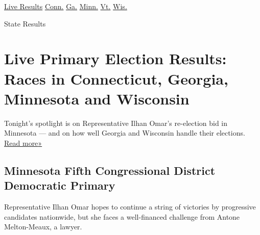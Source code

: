 \href{https://www.nytimes3xbfgragh.onion/interactive/2020/08/11/us/elections/results-connecticut-georgia-minnesota-wisconsin-primaries.html?action=click\&module=ELEX_results\&pgtype=Interactive\&region=Navigation}{Live
Results}
\href{https://www.nytimes3xbfgragh.onion/interactive/2020/08/11/us/elections/results-connecticut-primary-elections.html?action=click\&module=ELEX_results\&pgtype=Interactive\&region=Navigation}{Conn.}
\href{https://www.nytimes3xbfgragh.onion/interactive/2020/08/11/us/elections/results-georgia-primary-runoff-elections.html?action=click\&module=ELEX_results\&pgtype=Interactive\&region=Navigation}{Ga.}
\href{https://www.nytimes3xbfgragh.onion/interactive/2020/08/11/us/elections/results-minnesota-primary-elections.html?action=click\&module=ELEX_results\&pgtype=Interactive\&region=Navigation}{Minn.}
\href{https://www.nytimes3xbfgragh.onion/interactive/2020/08/11/us/elections/results-vermont-primary-elections.html?action=click\&module=ELEX_results\&pgtype=Interactive\&region=Navigation}{Vt.}
\href{https://www.nytimes3xbfgragh.onion/interactive/2020/08/11/us/elections/results-wisconsin-primary-elections.html?action=click\&module=ELEX_results\&pgtype=Interactive\&region=Navigation}{Wis.}

 State Results

\hypertarget{live-primary-election-results-races-in-connecticut-georgia-minnesota-and-wisconsin-1}{%
\section{Live Primary Election Results: Races in Connecticut, Georgia,
Minnesota and
Wisconsin}\label{live-primary-election-results-races-in-connecticut-georgia-minnesota-and-wisconsin-1}}

Tonight's spotlight is on Representative Ilhan Omar's re-election bid in
Minnesota --- and on how well Georgia and Wisconsin handle their
elections.
\href{https://www.nytimes3xbfgragh.onion/2020/08/11/us/politics/ilhan-omar.html}{Read
more}\href{https://www.nytimes3xbfgragh.onion/2020/08/11/us/politics/ilhan-omar.html}{»}

\hypertarget{minnesota-fifth-congressional-district-democratic-primary}{%
\subsection{Minnesota Fifth Congressional District Democratic
Primary}\label{minnesota-fifth-congressional-district-democratic-primary}}

Representative Ilhan Omar hopes to continue a string of victories by
progressive candidates nationwide, but she faces a well-financed
challenge from Antone Melton-Meaux, a lawyer.


